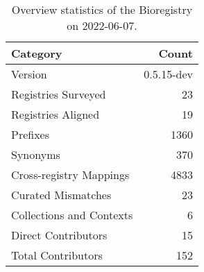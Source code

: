 \begin{table}
\centering
\caption{Overview statistics of the Bioregistry on 2022-06-07.}
\label{tab:bioregistry-summary}
\begin{tabular}{lr}
\toprule
                Category &      Count \\
\midrule
                 Version & 0.5.15-dev \\
     Registries Surveyed &         23 \\
      Registries Aligned &         19 \\
                Prefixes &       1360 \\
                Synonyms &        370 \\
 Cross-registry Mappings &       4833 \\
      Curated Mismatches &         23 \\
Collections and Contexts &          6 \\
     Direct Contributors &         15 \\
      Total Contributors &        152 \\
\bottomrule
\end{tabular}
\end{table}

